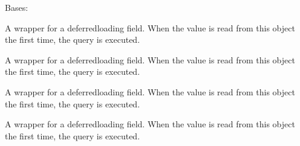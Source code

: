 \documentclass[letterpaper,10pt,spanish]{sphinxmanual}
\begin{document}
\begin{fulllineitems}
\begin{fulllineitems}
\end{fulllineitems}



\begin{fulllineitems}

\pysigstartsignatures
{}
\pysigstopsignatures
\sphinxAtStartPar
Bases: 

\end{fulllineitems}



\begin{fulllineitems}

\pysigstartsignatures
{}
\pysigstopsignatures
\sphinxAtStartPar
A wrapper for a deferred\sphinxhyphen{}loading field. When the value is read from this
object the first time, the query is executed.

\end{fulllineitems}



\begin{fulllineitems}

\pysigstartsignatures
{}
\pysigstopsignatures
\sphinxAtStartPar
A wrapper for a deferred\sphinxhyphen{}loading field. When the value is read from this
object the first time, the query is executed.

\end{fulllineitems}



\begin{fulllineitems}

\pysigstartsignatures
{}
\pysigstopsignatures
\sphinxAtStartPar
A wrapper for a deferred\sphinxhyphen{}loading field. When the value is read from this
object the first time, the query is executed.

\end{fulllineitems}



\begin{fulllineitems}

\pysigstartsignatures
{}
\pysigstopsignatures
\sphinxAtStartPar
A wrapper for a deferred\sphinxhyphen{}loading field. When the value is read from this
object the first time, the query is executed.


\end{fulllineitems}
\end{fulllineitems}
\end{document}
